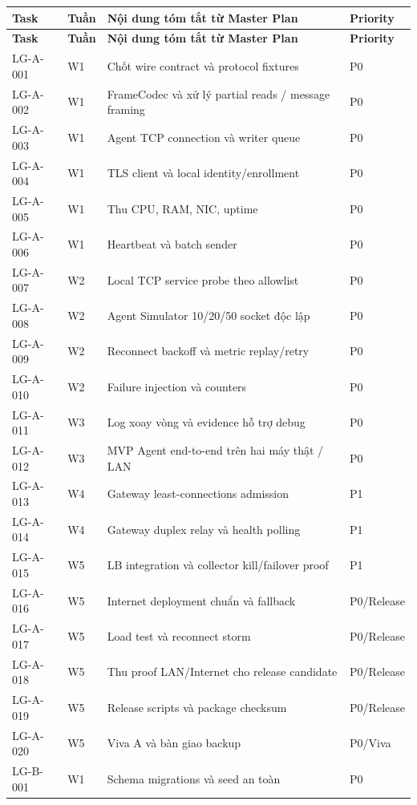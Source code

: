 \begin{longtable}{p{1.5cm} p{0.9cm} p{10.5cm} p{1.6cm}}
\toprule
\textbf{Task} & \textbf{Tuần} & \textbf{Nội dung tóm tắt từ Master Plan} & \textbf{Priority} \\
\midrule
\endfirsthead
\toprule
\textbf{Task} & \textbf{Tuần} & \textbf{Nội dung tóm tắt từ Master Plan} & \textbf{Priority} \\
\midrule
\endhead
LG-A-001 & W1 & Chốt wire contract và protocol fixtures & P0 \\
LG-A-002 & W1 & FrameCodec và xử lý partial reads / message framing & P0 \\
LG-A-003 & W1 & Agent TCP connection và writer queue & P0 \\
LG-A-004 & W1 & TLS client và local identity/enrollment & P0 \\
LG-A-005 & W1 & Thu CPU, RAM, NIC, uptime & P0 \\
LG-A-006 & W1 & Heartbeat và batch sender & P0 \\
LG-A-007 & W2 & Local TCP service probe theo allowlist & P0 \\
LG-A-008 & W2 & Agent Simulator 10/20/50 socket độc lập & P0 \\
LG-A-009 & W2 & Reconnect backoff và metric replay/retry & P0 \\
LG-A-010 & W2 & Failure injection và counters & P0 \\
LG-A-011 & W3 & Log xoay vòng và evidence hỗ trợ debug & P0 \\
LG-A-012 & W3 & MVP Agent end-to-end trên hai máy thật / LAN & P0 \\
LG-A-013 & W4 & Gateway least-connections admission & P1 \\
LG-A-014 & W4 & Gateway duplex relay và health polling & P1 \\
LG-A-015 & W5 & LB integration và collector kill/failover proof & P1 \\
LG-A-016 & W5 & Internet deployment chuẩn và fallback & P0/Release \\
LG-A-017 & W5 & Load test và reconnect storm & P0/Release \\
LG-A-018 & W5 & Thu proof LAN/Internet cho release candidate & P0/Release \\
LG-A-019 & W5 & Release scripts và package checksum & P0/Release \\
LG-A-020 & W5 & Viva A và bàn giao backup & P0/Viva \\
\midrule
LG-B-001 & W1 & Schema migrations và seed an toàn & P0 \\

\end{longtable}
